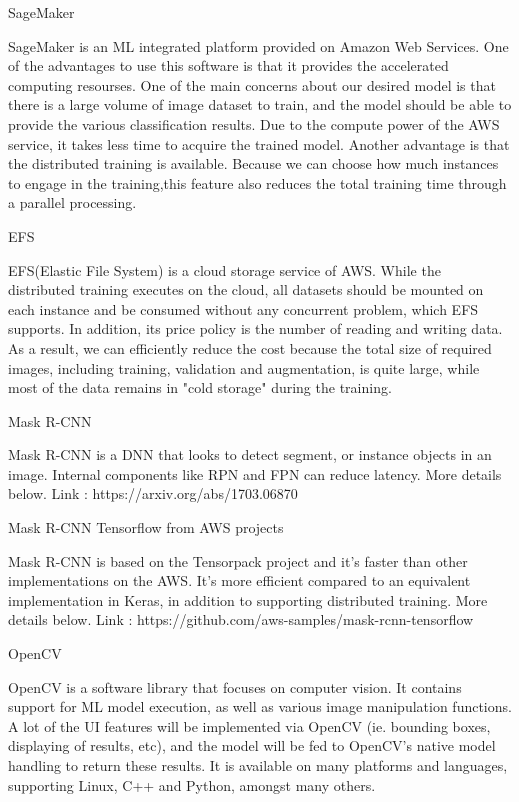 \documentclass[conference]{IEEEtran}
\begin{document}
\begin{center}
SageMaker
\end{center}
SageMaker is an ML integrated platform provided on Amazon Web Services. One of the advantages to use this software is that it provides the accelerated computing resourses. One of the main concerns about our desired model is that there is a large volume of image dataset to train, and the model should be able to provide the various classification results. Due to the compute power of the AWS service, it takes less time to acquire the trained model.
Another advantage is that the distributed training is available. Because we can choose how much instances to engage in the training,this feature also reduces the total training time through a parallel processing.
\newline
\begin{center}
EFS
\end{center}
EFS(Elastic File System) is a cloud storage service of AWS. While the distributed training executes on the cloud, all datasets should be mounted on each instance and be consumed without any concurrent problem, which EFS supports. In addition, its price policy is the number of reading and writing data. As a result, we can efficiently reduce the cost because the total size of required images, including training, validation and augmentation, is quite large, while most of the data remains in "cold storage" during the training.
\newline
\begin{center}
Mask R-CNN
\end{center}
Mask R-CNN is a DNN that looks to detect segment, or instance objects in an image. Internal components like RPN and FPN can reduce latency. More details below.
\newline
Link : https://arxiv.org/abs/1703.06870
\newline
\begin{center}
Mask R-CNN Tensorflow from AWS projects
\end{center}
Mask R-CNN is based on the Tensorpack project and it's faster than other implementations on the AWS. It's more efficient compared to an equivalent implementation in Keras, in addition to supporting distributed training. More details below.
\newline
Link : https://github.com/aws-samples/mask-rcnn-tensorflow

\begin{center}
OpenCV
\end{center}
OpenCV is a software library that focuses on computer vision. It contains support for ML model execution, as well as various image manipulation functions. A lot of the UI features will be implemented via OpenCV (ie. bounding boxes, displaying of results, etc), and the model will be fed to OpenCV's native model handling to return these results. It is available on many platforms and languages, supporting Linux, C++ and Python, amongst many others.
    
\end{document}
